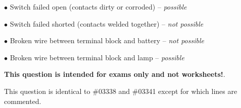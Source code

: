 \medskip
\item{$\bullet$} Switch failed open (contacts dirty or corroded) -- {\it possible} 
\item{$\bullet$} Switch failed shorted (contacts welded together) -- {\it not possible}
\item{$\bullet$} Broken wire between terminal block and battery -- {\it not possible}
\item{$\bullet$} Broken wire between terminal block and lamp -- {\it possible}
\medskip







{\bf This question is intended for exams only and not worksheets!}.

This question is identical to \#03338 and \#03341 except for which lines are commented.



